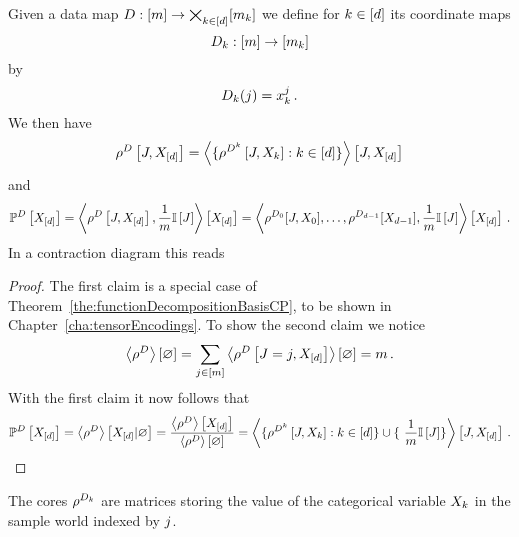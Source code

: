 \begin{theorem}\label{the:empCPRep}
	Given a data map $D: [m] \rightarrow \bigtimes_{k\in[d]}[m_{k}]$ we define for $k\in[d]$ its coordinate maps
		\[ D_{k} : [m] \rightarrow [m_{k}] \]
	by
		\[  D_{k}(j) = x_{k}^j \, .  \]
	We then have
	\begin{align*}
		\rho^{D}\left[J,X_{[d]}\right]  
		= \left\langle 
		\{\rho^{D^{k}}\left[J,X_{k}\right] : k\in[d] \} 
		\right\rangle \left[ J,X_{[d]} \right] 
	\end{align*}
	and
	\begin{align*}
	\mathbb{P}^{D}\left[X_{[d]}\right]
	= \left\langle \rho^{D}\left[J,X_{[d]}\right], \frac{1}{m}\mathbb{I}\left[J\right]\right\rangle \left[ X_{[d]} \right] 
	= \left\langle \rho^{D_{0}}[J,X_{0}],\ldots,\rho^{D_{d-1}}[X_{d-1}], \frac{1}{m}\mathbb{I}\left[J\right]\right\rangle \left[ X_{[d]} \right] \, . 
	\end{align*}
	In a contraction diagram this reads
	\begin{center}
		
	\end{center}
\end{theorem}
\begin{proof}
	The first claim is a special case of Theorem~\ref{the:functionDecompositionBasisCP}, to be shown in Chapter~\ref{cha:tensorEncodings}.
	To show the second claim we notice
		\[ \left\langle \rho^{D}\right\rangle \left[ \varnothing \right] = \sum_{j\in[m]} \left\langle \rho^{D}\left[J=j,X_{[d]}\right]\right\rangle \left[ \varnothing \right] = m \,  . \]
	With the first claim it now follows that
	\begin{align*}
		\empdistributionat{\shortcatvariables}
		 = \sbnormationof{\datacore}{\shortcatvariables}
		 = \frac{\sbcontractionof{\datacore}{\shortcatvariables}}{\sbcontraction{\datacore}} 
		 =  \contractionof{
		\{\rencodingofat{\datamap^{\atomenumerator}}{\datvariable,\catvariableof{\atomenumerator}} : \atomenumeratorin \} \cup \{ \frac{1}{\datanum} \onesat{\datvariable} \}
		}{\datvariable,\shortcatvariables}  \, . 
	\end{align*}
\end{proof}


The cores $\rho^{D_{k}}$ are matrices storing the value of the categorical variable $X_{k}$ in the sample world indexed by $j$.

